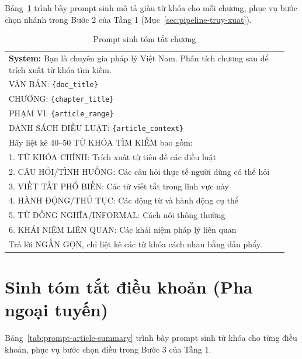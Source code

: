 Bảng~\ref{tab:prompt-chapter-summary} trình bày prompt sinh mô tả giàu từ khóa cho mỗi chương, phục vụ bước
chọn nhánh trong Bước 2 của Tầng 1 (Mục~\ref{sec:pipeline-truy-xuat}).

\begin{table}[htbp]
  \centering
  \caption{Prompt sinh tóm tắt chương}
  \label{tab:prompt-chapter-summary}
  \begin{tabular}{p{0.95\linewidth}}
    \toprule
    \textbf{System:} Bạn là chuyên gia pháp lý Việt Nam. Phân tích chương sau để trích xuất từ
    khóa tìm kiếm. \\[6pt]
    VĂN BẢN: \texttt{\{doc\_title\}} \\
    CHƯƠNG: \texttt{\{chapter\_title\}} \\
    PHẠM VI: \texttt{\{article\_range\}} \\
    DANH SÁCH ĐIỀU LUẬT: \texttt{\{article\_context\}} \\[6pt]
    Hãy liệt kê 40--50 TỪ KHÓA TÌM KIẾM bao gồm: \\
    1. TỪ KHÓA CHÍNH: Trích xuất từ tiêu đề các điều luật \\
    2. CÂU HỎI/TÌNH HUỐNG: Các câu hỏi thực tế người dùng có thể hỏi \\
    3. VIẾT TẮT PHỔ BIẾN: Các từ viết tắt trong lĩnh vực này \\
    4. HÀNH ĐỘNG/THỦ TỤC: Các động từ và hành động cụ thể \\
    5. TỪ ĐỒNG NGHĨA/INFORMAL: Cách nói thông thường \\
    6. KHÁI NIỆM LIÊN QUAN: Các khái niệm pháp lý liên quan \\[6pt]
    Trả lời NGẮN GỌN, chỉ liệt kê các từ khóa cách nhau bằng dấu phẩy. \\
    \bottomrule
  \end{tabular}
\end{table}

\section{Sinh tóm tắt điều khoản (Pha ngoại tuyến)}
\label{sec:app-prompt-article-summary}

Bảng~\ref{tab:prompt-article-summary} trình bày prompt sinh từ khóa cho từng điều khoản, phục vụ bước chọn điều trong Bước 3
của Tầng 1.

